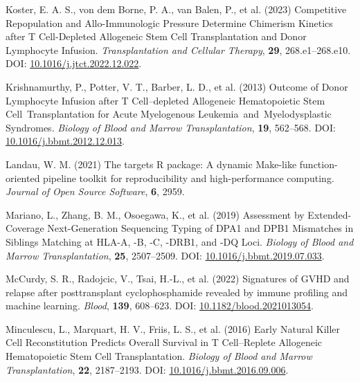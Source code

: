 \documentclass[
  letterpaper,
  DIV=11,
  numbers=noendperiod]{scrreprt}
\newlength{\cslhangindent}
\newlength{\cslentryspacingunit} %
\newenvironment{CSLReferences}[2] %
 {%
  \setlength{\parindent}{0pt}
  \ifodd #1
  \let\oldpar\par
  \def\par{\hangindent=\cslhangindent\oldpar}
  \fi
  \setlength{\parskip}{#2\cslentryspacingunit}
 }%
 {}
\begin{document}
\begin{CSLReferences}{1}{0}
\leavevmode{}%
Koster, E. A. S., von dem Borne, P. A., van Balen, P., et al. (2023)
Competitive {Repopulation} and {Allo-Immunologic Pressure Determine
Chimerism Kinetics} after {T Cell-Depleted Allogeneic Stem Cell
Transplantation} and {Donor Lymphocyte Infusion}. \emph{Transplantation
and Cellular Therapy}, \textbf{29}, 268.e1--268.e10. DOI:
\href{https://doi.org/10.1016/j.jtct.2022.12.022}{10.1016/j.jtct.2022.12.022}.

\leavevmode{}%
Krishnamurthy, P., Potter, V. T., Barber, L. D., et al. (2013) Outcome
of {Donor Lymphocyte Infusion} after {T Cell}--depleted {Allogeneic
Hematopoietic Stem Cell~Transplantation} for {Acute Myelogenous
Leukemia}~and~{Myelodysplastic Syndromes}. \emph{Biology of Blood and
Marrow Transplantation}, \textbf{19}, 562--568. DOI:
\href{https://doi.org/10.1016/j.bbmt.2012.12.013}{10.1016/j.bbmt.2012.12.013}.

\leavevmode{}%
Landau, W. M. (2021) The targets {R} package: A dynamic {Make-like}
function-oriented pipeline toolkit for reproducibility and
high-performance computing. \emph{Journal of Open Source Software},
\textbf{6}, 2959.

\leavevmode{}%
Mariano, L., Zhang, B. M., Osoegawa, K., et al. (2019) Assessment by
{Extended-Coverage Next-Generation Sequencing Typing} of {DPA1} and
{DPB1 Mismatches} in {Siblings Matching} at {HLA-A}, -{B}, -{C},
-{DRB1}, and -{DQ Loci}. \emph{Biology of Blood and Marrow
Transplantation}, \textbf{25}, 2507--2509. DOI:
\href{https://doi.org/10.1016/j.bbmt.2019.07.033}{10.1016/j.bbmt.2019.07.033}.

\leavevmode{}%
McCurdy, S. R., Radojcic, V., Tsai, H.-L., et al. (2022) Signatures of
{GVHD} and relapse after posttransplant cyclophosphamide revealed by
immune profiling and machine learning. \emph{Blood}, \textbf{139},
608--623. DOI:
\href{https://doi.org/10.1182/blood.2021013054}{10.1182/blood.2021013054}.

\leavevmode{}%
Minculescu, L., Marquart, H. V., Friis, L. S., et al. (2016) Early
{Natural Killer Cell Reconstitution Predicts Overall Survival} in {T
Cell}--{Replete Allogeneic Hematopoietic Stem Cell Transplantation}.
\emph{Biology of Blood and Marrow Transplantation}, \textbf{22},
2187--2193. DOI:
\href{https://doi.org/10.1016/j.bbmt.2016.09.006}{10.1016/j.bbmt.2016.09.006}.


\end{CSLReferences}
\end{document}
